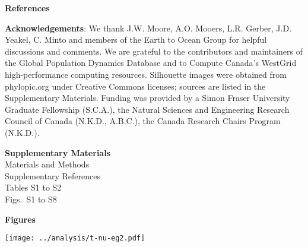 \textbf{References}

\renewcommand{\section}[2]{}%



\textbf{Acknowledgements}: We thank J.W. Moore, A.O. Mooers, L.R. Gerber, J.D. Yeakel, C. Minto and members of the Earth to Ocean Group for helpful discussions and comments. We are grateful to the contributors and maintainers of the Global Population Dynamics Database and to Compute Canada's WestGrid high-performance computing resources. Silhouette images were obtained from phylopic.org under Creative Commons licenses; sources are listed in the Supplementary Materials. Funding was provided by a Simon Fraser University Graduate Fellowship (S.C.A.), the Natural Sciences and Engineering Research Council of Canada (N.K.D., A.B.C.), the Canada Research Chairs Program (N.K.D.).

\textbf{Supplementary Materials}\\
Materials and Methods\\
Supplementary References\\
Tables S1 to S2\\
Figs.~S1 to S8\\



\clearpage

\textbf{Figures}

\begin{center}
\texttt{[image: ../analysis/t-nu-eg2.pdf]}
\end{center}

